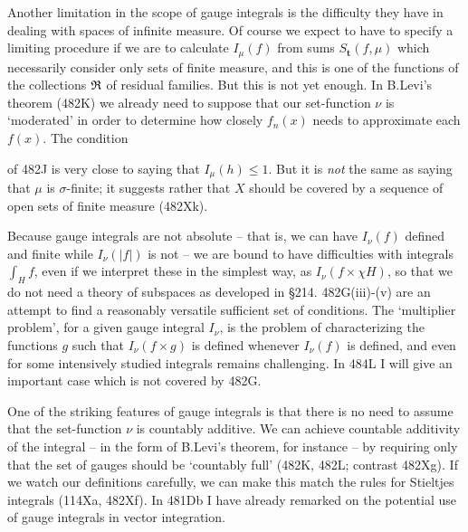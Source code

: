 {Another limitation in the scope of gauge integrals is the difficulty
they have in dealing with spaces of infinite measure.   Of course we
expect to have to specify a limiting procedure if we are to calculate
$I_{\mu}(f)$ from sums $S_{\pmb{t}}(f,\mu)$ which necessarily consider
only sets of finite measure, and this is one of the functions of the
collections $\frak R$ of residual families.   But this is not yet
enough.   In B.Levi's theorem (482K) we already need to suppose that our
set-function $\nu$ is `moderated' in order to determine how closely
$f_n(x)$ needs to approximate each $f(x)$.   The condition


\noindent of 482J is very close to saying that $I_{\mu}(h)\le 1$.   But
it is {\it not} the same as saying that $\mu$ is $\sigma$-finite;  it
suggests rather that $X$ should be covered by a sequence of open sets
of finite measure (482Xk).

Because gauge integrals are not absolute -- that is, we can have
$I_{\nu}(f)$ defined and finite while $I_{\nu}(|f|)$ is not -- we are
bound to have difficulties with integrals $\int_Hf$, even if we
interpret these in the simplest way, as $I_{\nu}(f\times\chi H)$, so
that we do not need a theory of subspaces as developed in \S214.
482G(iii)-(v) are an
attempt to find a reasonably versatile sufficient set of conditions.
The `multiplier problem', for a given gauge integral $I_{\nu}$, is the
problem of characterizing the functions $g$ such that
$I_{\nu}(f\times g)$ is defined whenever $I_{\nu}(f)$ is defined, and
even for some intensively studied integrals remains challenging.   In
484L I will give an important case which is not covered by 482G.

One of the striking features of gauge integrals is that there is no
need
to assume that the set-function $\nu$ is countably additive.   We can
achieve countable additivity of the integral -- in the form of
B.Levi's
theorem, for instance -- by requiring only that the set of gauges
should
be `countably full' (482K, 482L;  contrast 482Xg).   If we watch our
definitions carefully, we can make this match the rules for Stieltjes
integrals (114Xa, 482Xf).   In 481Db I have already remarked on the
potential use of gauge integrals in vector integration.

}
